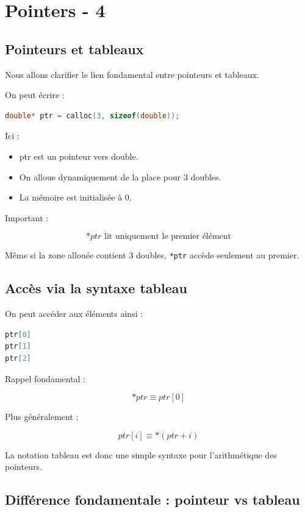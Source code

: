 
\chapter{Pointers - 4}
\label{chap:pointers_}

\section{Pointeurs et tableaux}

Nous allons clarifier le lien fondamental entre pointeurs et tableaux.

On peut écrire :

\begin{lstlisting}[language=C]
double* ptr = calloc(3, sizeof(double));
\end{lstlisting}

Ici :

\begin{itemize}
\item ptr est un pointeur vers double.
\item On alloue dynamiquement de la place pour 3 doubles.
\item La mémoire est initialisée à 0.
\end{itemize}

Important :

\[
\boxed{
*ptr \text{ lit uniquement le premier élément}
}
\]

Même si la zone allouée contient 3 doubles,
\texttt{*ptr} accède seulement au premier.

\section{Accès via la syntaxe tableau}

On peut accéder aux éléments ainsi :

\begin{lstlisting}[language=C]
ptr[0]
ptr[1]
ptr[2]
\end{lstlisting}

Rappel fondamental :

\[
\boxed{
*ptr \equiv ptr[0]
}
\]

Plus généralement :

\[
ptr[i] \equiv *(ptr + i)
\]

La notation tableau est donc une simple syntaxe
pour l’arithmétique des pointeurs.

\section{Différence fondamentale : pointeur vs tableau}

